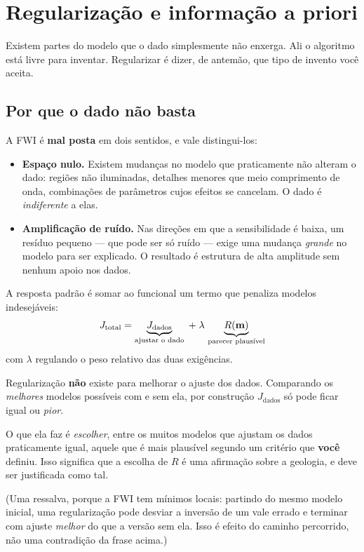 \documentclass[11pt,a4paper,oneside]{report}
\begin{document}
\chapter{Regulariza\c{c}\~ao e informa\c{c}\~ao a priori}
\label{cap:regularizacao}

\begin{ideia}
Existem partes do modelo que o dado simplesmente n\~ao enxerga. Ali o
algoritmo est\'a livre para inventar. Regularizar \'e dizer, de antem\~ao, que
tipo de invento voc\^e aceita.
\end{ideia}

\section{Por que o dado n\~ao basta}

A FWI \'e \textbf{mal posta} em dois sentidos, e vale distingui-los:

\begin{itemize}[leftmargin=*]
\item \textbf{Espa\c{c}o nulo.} Existem mudan\c{c}as no modelo que praticamente
n\~ao alteram o dado: regi\~oes n\~ao iluminadas, detalhes menores que meio
comprimento de onda, combina\c{c}\~oes de par\^ametros cujos efeitos se
cancelam. O dado \'e \emph{indiferente} a elas.
\item \textbf{Amplifica\c{c}\~ao de ru\'ido.} Nas dire\c{c}\~oes em que a
sensibilidade \'e baixa, um res\'iduo pequeno --- que pode ser s\'o ru\'ido
--- exige uma mudan\c{c}a \emph{grande} no modelo para ser explicado. O
resultado \'e estrutura de alta amplitude sem nenhum apoio nos dados.
\end{itemize}

A resposta padr\~ao \'e somar ao funcional um termo que penaliza modelos
indesej\'aveis:
\begin{equation}
J_{\text{total}} = \underbrace{J_{\text{dados}}}_{\text{ajustar o dado}}
 \;+\; \lambda\,\underbrace{R(\mathbf{m})}_{\text{parecer plaus\'ivel}}
\end{equation}
com $\lambda$ regulando o peso relativo das duas exig\^encias.

\begin{atencao}
Regulariza\c{c}\~ao \textbf{n\~ao} existe para melhorar o ajuste dos dados.
Comparando os \emph{melhores} modelos poss\'iveis com e sem ela, por
constru\c{c}\~ao $J_{\text{dados}}$ s\'o pode ficar igual ou \emph{pior}.

O que ela faz \'e \emph{escolher}, entre os muitos modelos que ajustam os
dados praticamente igual, aquele que \'e mais plaus\'ivel segundo um
crit\'erio que \textbf{voc\^e} definiu. Isso significa que a escolha de $R$ \'e
uma afirma\c{c}\~ao sobre a geologia, e deve ser justificada como tal.

(Uma ressalva, porque a FWI tem m\'inimos locais: partindo do mesmo modelo
inicial, uma regulariza\c{c}\~ao pode desviar a invers\~ao de um vale errado e
terminar com ajuste \emph{melhor} do que a vers\~ao sem ela. Isso \'e efeito do
caminho percorrido, n\~ao uma contradi\c{c}\~ao da frase acima.)
\end{atencao}
\end{document}
